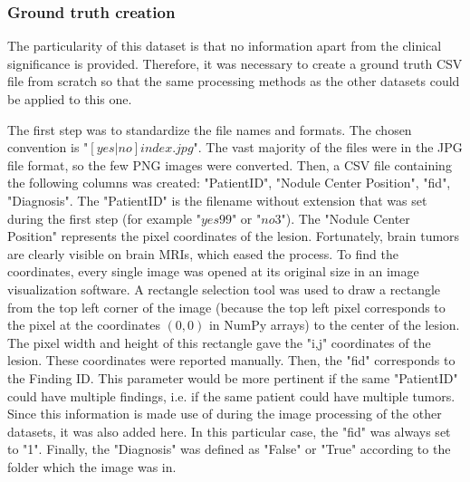 \subsubsection{Ground truth creation}
\label{sec:braingroundtruth}
\setlength{\marginparwidth}{3cm}\leavevmode {}The particularity of this dataset is that no information apart from the clinical significance is provided. Therefore, it was necessary to create a ground truth CSV file from scratch so that the same processing methods as the other datasets could be applied to this one. 

The first step was to standardize the file names and formats. The chosen convention is "$[yes|no]{index}.jpg$". The vast majority of the files were in the JPG file format, so the few PNG images were converted. Then, a CSV file containing the following columns was created: "PatientID", "Nodule Center Position", "fid", "Diagnosis". The "PatientID" is the filename without extension that was set during the first step (for example "$yes99$" or "$no3$"). The "Nodule Center Position" represents the pixel coordinates of the lesion. Fortunately, brain tumors are clearly visible on brain MRIs, which eased the process. To find the coordinates, every single image was opened at its original size in an image visualization software. A rectangle selection tool was used to draw a rectangle from the top left corner of the image (because the top left pixel corresponds to the pixel at the coordinates $(0,0)$ in NumPy arrays) to the center of the lesion. The pixel width and height of this rectangle gave the "i,j" coordinates of the lesion. These coordinates were reported manually. Then, the "fid" corresponds to the Finding ID. This parameter would be more pertinent if the same "PatientID" could have multiple findings, i.e. if the same patient could have multiple tumors. Since this information is made use of during the image processing of the other datasets, it was also added here. In this particular case, the "fid" was always set to "1". Finally, the "Diagnosis" was defined as "False" or "True" according to the folder which the image was in. 


